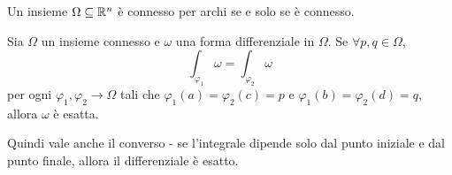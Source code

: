 \documentclass[a4paper]{article}
\begin{document}
\begin{snippettheorem}{}
    Un insieme \(\Omega \subseteq \mathbb{R}^n\)
    è connesso per archi se e solo se è connesso.
\end{snippettheorem}

\begin{snippettheorem}{}
    Sia \(\Omega\) un insieme connesso e \(\omega\)
    una forma differenziale in \(\Omega\).
    Se \(\forall p, q \in \Omega\),
    \[
        \int_{\varphi_1} \omega = \int_{\varphi_2} \omega
    \]
    per ogni \(\varphi_1, \varphi_2 \to \Omega\)
    tali che \(\varphi_1(a) = \varphi_2(c) = p\)
    e \(\varphi_1(b) = \varphi_2(d) = q\),
    allora \(\omega\) è esatta.
\end{snippettheorem}

Quindi vale anche il converso - se l'integrale dipende solo dal punto
iniziale e dal punto finale, allora il differenziale è esatto.
\end{document}
